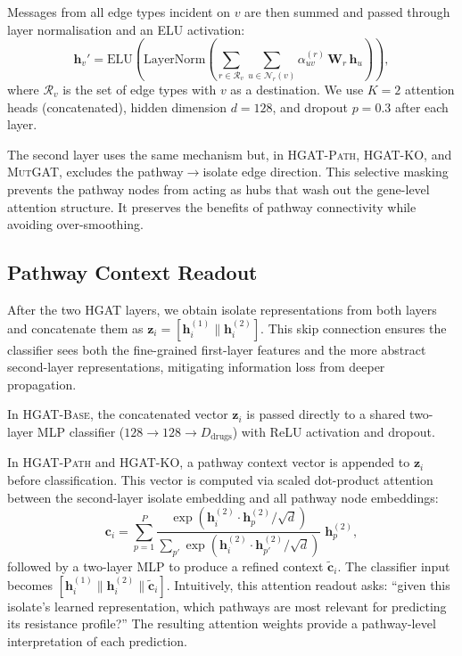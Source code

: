\documentclass{article}
\theoremstyle{plain}
\theoremstyle{definition}
\theoremstyle{remark}
\begin{document}
Messages from all edge types incident on $v$ are then summed and passed through layer normalisation and an ELU activation:
\begin{equation}
    \mathbf{h}_v' = \text{ELU}\!\left(\text{LayerNorm}\!\left(\sum_{r \in \mathcal{R}_v} \sum_{u \in \mathcal{N}_r(v)} \alpha_{uv}^{(r)}\, \mathbf{W}_r\, \mathbf{h}_u \right)\right),
\label{eq:update}
\end{equation}
where $\mathcal{R}_v$ is the set of edge types with $v$ as a destination. We use $K=2$ attention heads (concatenated), hidden dimension $d=128$, and dropout $p=0.3$ after each layer.

The second layer uses the same mechanism but, in \textsc{HGAT-Path}, \textsc{HGAT-KO}, and \textsc{MutGAT}, excludes the pathway$\to$isolate edge direction. This selective masking prevents the pathway nodes from acting as hubs that wash out the gene-level attention structure. It preserves the benefits of pathway connectivity while avoiding over-smoothing.

\subsection{Pathway Context Readout}
\label{sec:classifier}

After the two HGAT layers, we obtain isolate representations from both layers and concatenate them as $\mathbf{z}_i = [\mathbf{h}_i^{(1)} \| \mathbf{h}_i^{(2)}]$. This skip connection ensures the classifier sees both the fine-grained first-layer features and the more abstract second-layer representations, mitigating information loss from deeper propagation.

In \textsc{HGAT-Base}, the concatenated vector $\mathbf{z}_i$ is passed directly to a shared two-layer MLP classifier ($128 \to 128 \to D_{\text{drugs}}$) with ReLU activation and dropout.

In \textsc{HGAT-Path} and \textsc{HGAT-KO}, a pathway context vector is appended to $\mathbf{z}_i$ before classification. This vector is computed via scaled dot-product attention between the second-layer isolate embedding and all pathway node embeddings:
\begin{equation}
    \mathbf{c}_i = \sum_{p=1}^{P} \frac{\exp(\mathbf{h}_i^{(2)} \cdot \mathbf{h}_p^{(2)} / \sqrt{d})}{\sum_{p'} \exp(\mathbf{h}_i^{(2)} \cdot \mathbf{h}_{p'}^{(2)} / \sqrt{d})} \; \mathbf{h}_p^{(2)},
\label{eq:pwy_ctx}
\end{equation}
followed by a two-layer MLP to produce a refined context $\tilde{\mathbf{c}}_i$. The classifier input becomes $[\mathbf{h}_i^{(1)} \| \mathbf{h}_i^{(2)} \| \tilde{\mathbf{c}}_i]$. Intuitively, this attention readout asks: ``given this isolate's learned representation, which pathways are most relevant for predicting its resistance profile?'' The resulting attention weights provide a pathway-level interpretation of each prediction.
\end{document}
